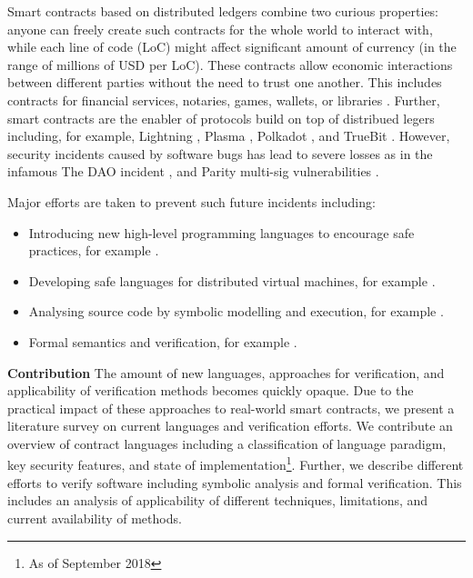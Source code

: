 \documentclass{llncs}
\begin{document}
Smart contracts based on distributed ledgers combine two curious properties: anyone can freely create such contracts for the whole world to interact with, while each line of code (LoC) might affect significant amount of currency (in the range of millions of USD per LoC).
These contracts allow economic interactions between different parties without the need to trust one another.
This includes contracts for financial services, notaries, games, wallets, or libraries \cite{Bartoletti2017}.
Further, smart contracts are the enabler of protocols build on top of distribued legers including, for example, Lightning \cite{Poon2016}, Plasma \cite{Poon2017}, Polkadot \cite{Wood2017}, and TrueBit \cite{Teutsch2017}.
However, security incidents caused by software bugs has lead to severe losses as in the infamous The DAO incident \cite{Daian2016}, and Parity multi-sig vulnerabilities \cite{Breidenbach2017Parity,ParityTech2017}. 


Major efforts are taken to prevent such future incidents including:
\begin{itemize}
\item Introducing new high-level programming languages to encourage safe practices, for example  \cite{Hirai2018Bamboo,Ethereum2018Vyper,Schrans2018}.
\item Developing safe languages for distributed virtual machines, for example \cite{Sergey2018,DynamicLedgerSolutions2017,Popejoy2017,Kasampalis2018}.
\item Analysing source code by symbolic modelling and execution, for example \cite{Luu2016,Tsankov2017,Kalra2018,Albert2018}.
\item Formal semantics and verification, for example \cite{Bhargavan2016,Hildenbrandt2017,Hirai2017}.
\end{itemize}

\textbf{Contribution} The amount of new languages, approaches for verification, and applicability of verification methods becomes quickly opaque. Due to the practical impact of these approaches to real-world smart contracts, we present a literature survey on current languages and verification efforts.
We contribute an overview of contract languages including a classification of language paradigm, key security features, and state of implementation\footnote{As of September 2018}.
Further, we describe different efforts to verify software including symbolic analysis and formal verification. This includes an analysis of applicability of different techniques, limitations, and current availability of methods.
\end{document}
